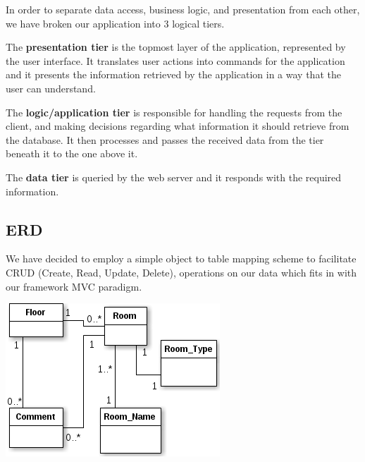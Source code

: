 \documentclass{sig-alt-release2}
\begin{document}
In order to separate data access, business logic, and presentation from each
other, we have broken our application into 3 logical tiers.

The \textbf{presentation tier} is the topmost layer of the application,
represented by the user interface. It translates user actions into commands
for the application and it presents the information retrieved by the application in a
way that the user can understand.

The \textbf{logic/application tier} is responsible for handling the requests
from the client, and making decisions regarding what information it should
retrieve from the database. It then processes and passes the received data
from the tier beneath it to the one above it.

The \textbf{data tier} is queried by the web server and it responds with the
required information.

\subsection*{ERD}

We have decided to employ a simple object to table mapping scheme to facilitate
CRUD (Create, Read, Update, Delete), operations on our data which fits in with 
our framework MVC paradigm. 

\begin{center}
\includegraphics[scale=0.55]{img/erd.png}
\end{center}

\end{document}
